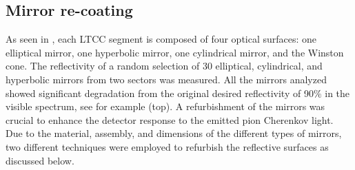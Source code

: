 \subsection{Mirror re-coating}

As seen in , each LTCC segment is composed of four optical surfaces: one elliptical mirror,
one hyperbolic mirror, one cylindrical mirror, and the Winston cone.
The reflectivity of a random selection of 30 elliptical, cylindrical, and hyperbolic mirrors from two sectors was measured.
All the mirrors analyzed showed significant degradation from the original desired reflectivity of 90$\%$ in the visible spectrum,
see for example  (top).
A refurbishment of the mirrors was crucial to enhance the detector response to the emitted pion Cherenkov light.
Due to the material, assembly, and dimensions of the different types of mirrors, two different techniques were employed to refurbish the
reflective surfaces as discussed below.

